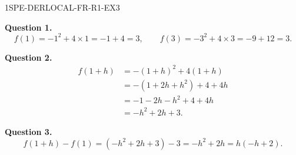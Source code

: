 \begin{corrige}{1SPE-DERLOCAL-FR-R1-EX3}

\textbf{Question 1.}
\[
f(1) = -1^2 + 4 \times 1 = -1 + 4 = 3, \qquad
f(3) = -3^2 + 4 \times 3 = -9 + 12 = 3.
\]


\textbf{Question 2.}
\begin{align*}
f(1+h) &= -(1+h)^2 + 4(1+h) \\
        &= -(1 + 2h + h^2) + 4 + 4h \\
        &= -1 - 2h - h^2 + 4 + 4h \\
        &= -h^2 + 2h + 3.
\end{align*}

\textbf{Question 3.}
\[
f(1+h) - f(1) = (-h^2 + 2h + 3) - 3 = -h^2 + 2h = h(-h + 2).
\]

\end{corrige}
